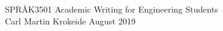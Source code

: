 \documentclass[a4paper]{article}
\begin{document}
\begin{titlepage}
\begin{center}
\Large SPRÅK3501 Academic Writing for Engineering Students \\
\vspace{10pt}
\large Carl Martin Krokeide
\large August 2019 
\end{center}
\end{titlepage}



 

%
\end{document}
